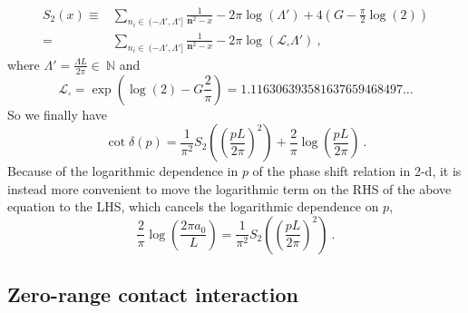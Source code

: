 \begin{align}
S_2(x)\equiv&\sum_{n_i\in\ (-\Lambda',\Lambda']}\frac { 1 } { \bm{n}^2 -x}-2\pi\log\left(\Lambda'\right)+4\left(G-\frac{\pi }{2}\log(2)\right)\\
=&\sum_{n_i\in\ (-\Lambda',\Lambda']}\frac { 1 } { \bm{n}^2 -x}-2\pi\log\left(\mathcal{L}_\square\Lambda'\right)\ ,
\end{align}
where $\Lambda'=\frac{\Lambda L}{2\pi} \in\ \mathbb{N}$ and
\begin{equation}
\mathcal{L}_\square=\exp\left(\log(2)-G\frac{2}{\pi}\right)=1.116306393581637659468497\ldots
\end{equation}
So we finally have
\begin{equation}\label{eqn:S2}
\cot\delta(p)=\frac{1}{\pi^2}S_2\left(\left(\frac{p L}{2\pi}\right)^2\right)+\frac{2}{\pi}\log\left(\frac{pL}{2\pi}\right)\ .
\end{equation}
Because of the logarithmic dependence in $p$ of the phase shift relation in 2-d, it is instead more convenient to move the logarithmic term on the RHS of the above equation to the LHS, which cancels the logarithmic dependence on $p$,
\begin{equation}
\frac{2}{\pi}\log\left(\frac{2\pi a_0 }{L}\right)=\frac{1}{\pi^2}S_2\left(\left(\frac{p L}{2\pi}\right)^2\right)\ .
\end{equation}

\subsection{Zero-range contact interaction}

